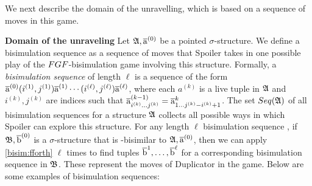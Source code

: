 \noindent
We next describe the domain of  the unravelling, which is based on a sequence of moves in this game.

\noindent \textbf{Domain of the unraveling}
Let ${\mathfrak{A}}, \overline{\mathrm{a}}^{(0)}$ be a pointed $\sigma$-structure. 
We define a bisimulation sequence as a sequence of moves that Spoiler takes in one possible play  of the $\FGF$-bisimulation game involving this structure.
Formally, a \emph{bisimulation sequence} of length $\ell$ is a sequence of the form $\overline{\mathrm{a}}^{(0)}(i^{(1)}, j^{(1)})\overline{\mathrm{a}}^{(1)}\cdots(i^{(\ell)}, j^{(\ell)})\overline{\mathrm{a}}^{(\ell)}$,  where each $a^{(k)}$ is a live tuple in ${\mathfrak{A}}$ and $i^{(k)}, j^{(k)}$ are indices such that $\overline{\mathrm{a}}_{i^{(k)}\ldots j^{(k)}}^{(k-1)} = \overline{\mathrm{a}}_{1\ldots j^{(k)}-i^{(k)}+1}^{k}$.
 The set $\Seq{A}$ of all bisimulation sequences for a structure ${\mathfrak{A}}$ collects all possible ways in which Spoiler can explore this structure.
For any length $\ell$ bisimulation sequence , if ${\mathfrak{B}}, \overline{\mathrm{b}}^{(0)}$ is a $\sigma$-structure that is \FGF-bisimilar to ${\mathfrak{A}}, \overline{\mathrm{a}}^{(0)}$, then we can apply \ref{bisim:fforth} $\ell$ times to find tuples $\overline{\mathrm{b}}^{1}, \ldots, \overline{\mathrm{b}}^{\ell}$ for a corresponding bisimulation sequence in ${\mathfrak{B}}$.
These represent the moves of Duplicator in the game.
Below are some examples of bisimulation sequences: 
